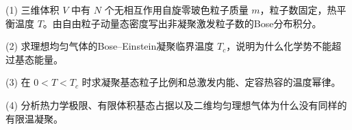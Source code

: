 (1) 三维体积 \(V\) 中有 \(N\) 个无相互作用自旋零玻色粒子质量 \(m\)，粒子数固定，热平衡温度 \(T\)。由自由粒子动量态密度写出非凝聚激发粒子数的Bose分布积分。

(2) 求理想均匀气体的Bose–Einstein凝聚临界温度 \(T_c\)，说明为什么化学势不能超过基态能量。

(3) 在 \(0<T<T_c\) 时求凝聚基态粒子比例和总激发内能、定容热容的温度幂律。

(4) 分析热力学极限、有限体积基态占据以及二维均匀理想气体为什么没有同样的有限温凝聚。
